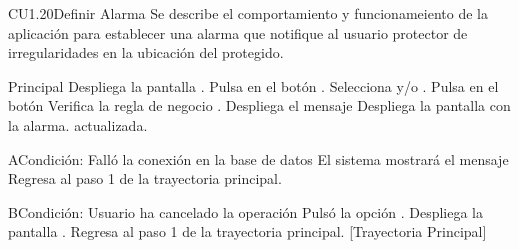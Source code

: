 \begin{UseCase}{CU1.20}{Definir Alarma}{
	Se describe el comportamiento y funcionameiento de la aplicación para establecer una alarma que notifique al usuario protector de irregularidades en la ubicación del protegido.}
	\end{UseCase}


	\begin{UCtrayectoria}{Principal}
		\UCpaso[\UCsist] Despliega la pantalla . 
		\UCpaso[\UCactor] Pulsa en el botón .
		\UCpaso[\UCactor] Selecciona  y/o . 
		\UCpaso[\UCactor] Pulsa en el botón  
		\UCpaso[\UCsist] Verifica la regla de negocio . 
		\UCpaso[\UCsist] Despliega el mensaje 	
		\UCpaso[\UCsist] Despliega la pantalla  con la alarma. actualizada. 
	\end{UCtrayectoria}


	\begin{UCtrayectoriaA}{A}{Condición: Falló la conexión en la base de datos}
		\UCpaso[\UCsist] El sistema mostrará el mensaje 
		\UCpaso[\UCsist] Regresa al paso 1 de la trayectoria principal. 
	\end{UCtrayectoriaA}
	\begin{UCtrayectoriaA}{B}{Condición: Usuario ha cancelado la operación}
		\UCpaso[\UCactor] Pulsó la opción .
		\UCpaso[\UCsist] Despliega la pantalla .
		\UCpaso[\UCsist] Regresa al paso 1 de la trayectoria principal. [Trayectoria Principal]
	\end{UCtrayectoriaA}

